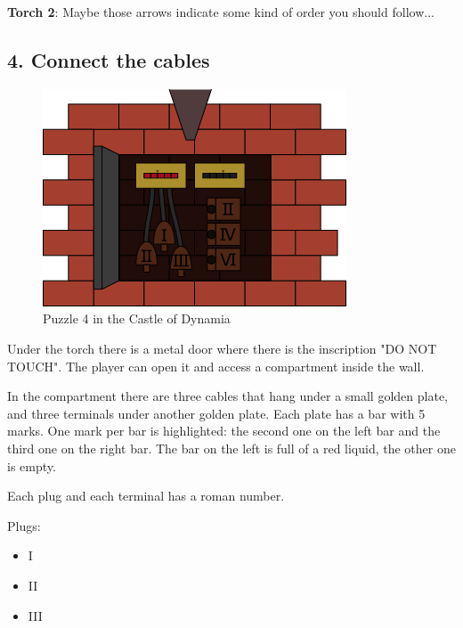 \textbf{Torch 2}: Maybe those arrows indicate some kind of order you should follow...


\subsection{4. Connect the cables}

\begin{figure}[H]
  \centering
  \includegraphics[width=\textwidth]{Images/Puzzles/castleOfDynamia4}
  \caption{Puzzle 4 in the Castle of Dynamia}
\end{figure}


Under the torch there is a metal door where there is the inscription "DO NOT TOUCH". The player can open it and access a compartment inside the wall.

In the compartment there are three cables that hang under a small golden plate, and three terminals under another golden plate. Each plate has a bar with 5 marks. One mark per bar is highlighted: the second one on the left bar and the third one on the right bar. The bar on the left is full of a red liquid, the other one is empty.

Each plug and each terminal has a roman number.

Plugs:
\begin{itemize}
	\item I
	\item II
	\item III
\end{itemize}

